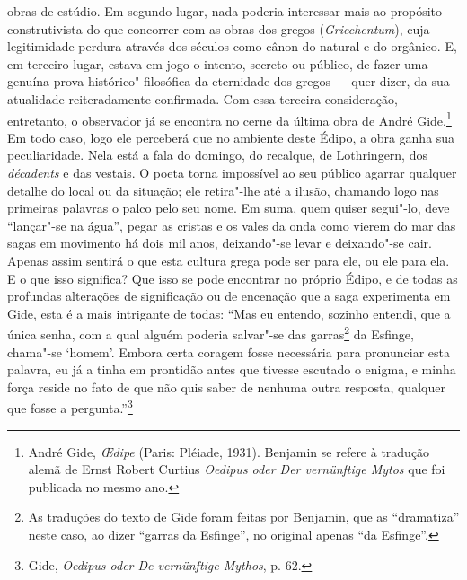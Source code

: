 obras de estúdio. Em segundo lugar, nada poderia
interessar mais ao propósito construtivista do que concorrer com as obras
dos gregos (\emph{Griechentum}), cuja legitimidade perdura através dos
séculos como cânon do natural e do orgânico. E, em terceiro lugar,
estava em jogo o intento, secreto ou público, de fazer uma genuína prova
histórico"-filosófica da eternidade dos gregos --- quer dizer, da sua
atualidade reiteradamente confirmada. Com essa terceira consideração,
entretanto, o observador já se encontra no cerne da última obra de André
Gide.\footnote{André Gide, \emph{\OE dipe} (Paris: Pléiade, 1931).
  Benjamin se refere à tradução alemã de Ernst Robert Curtius
  \emph{Oedipus oder Der vernünftige Mytos} que foi publicada no mesmo
  ano. \versal{[N. T.]}} Em todo caso, logo ele perceberá que no ambiente deste Édipo, a
obra ganha sua peculiaridade. Nela está a fala do domingo, do recalque, de
Lothringern, dos \emph{décadents} e das vestais. O poeta torna
impossível ao seu público agarrar qualquer detalhe do local ou da
situação; ele retira"-lhe até a ilusão, chamando logo nas primeiras
palavras o palco pelo seu nome. Em suma, quem quiser segui"-lo, deve
``lançar"-se na água'', pegar as cristas e os vales da onda como vierem
do mar das sagas em movimento há dois mil anos, deixando"-se levar e
deixando"-se cair. Apenas assim sentirá o que esta cultura grega pode
ser para ele, ou ele para ela. E o que isso significa? Que
isso se pode encontrar no próprio Édipo, e de todas as profundas alterações de significação ou de
encenação que a saga experimenta em Gide, esta é a mais intrigante de
todas: ``Mas eu entendo, sozinho entendi, que a única senha, com a qual
alguém poderia salvar"-se das garras\footnote{As traduções do texto
  de Gide foram feitas por Benjamin, que as ``dramatiza'' neste caso, ao
  dizer ``garras da Esfinge'', no original apenas ``da Esfinge''. \versal{[N. E.]}} da
Esfinge, chama"-se `homem'. Embora certa coragem fosse necessária para
pronunciar esta palavra, eu já a tinha em prontidão antes que tivesse
escutado o enigma, e minha força reside no fato de que não quis saber de
nenhuma outra resposta, qualquer que fosse a pergunta.''\footnote{Gide, \emph{Oedipus oder De vernünftige Mythos}, p. 62. \versal{[N. T.]}}

